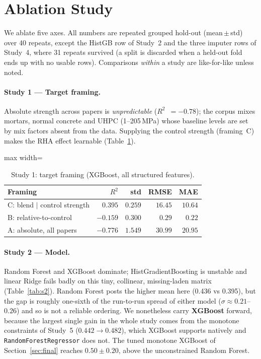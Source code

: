 \documentclass[11pt]{article}
\newcommand{\R}{$R^2$}
\begin{document}
\section{Ablation Study}
We ablate five axes. All numbers are repeated grouped hold-out (mean\,$\pm$\,std) over
40 repeats, except the HistGB row of Study~2 and the three imputer rows of Study~4,
where 31 repeats survived (a split is discarded when a held-out fold ends up with no
usable rows). Comparisons \emph{within} a study are like-for-like unless noted.

\paragraph{Study 1 --- Target framing.}
Absolute strength across papers is \emph{unpredictable} (\R{}~$=-0.78$); the corpus
mixes mortars, normal concrete and UHPC (1--205\,MPa) whose baseline levels are set by
mix factors absent from the data. Supplying the control strength (framing~C) makes the
RHA effect learnable (Table~\ref{tab:s1}).
\begin{table}[H]\centering\small
\caption{Study 1: target framing (XGBoost, all structured features).}
\label{tab:s1}
\begin{adjustbox}{max width=\linewidth}
\begin{tabular}{lrrrr}
\toprule
Framing & \R{} & std & RMSE & MAE \\
\midrule
\rowcolor{green!12}C: blend $\mid$ control strength & $0.395$ & $0.259$ & $16.45$ & $10.64$ \\
B: relative-to-control & $-0.159$ & $0.300$ & $0.29$ & $0.22$ \\
A: absolute, all papers & $-0.776$ & $1.549$ & $30.99$ & $20.95$ \\
\bottomrule
\end{tabular}
\end{adjustbox}
\end{table}


\paragraph{Study 2 --- Model.}
Random Forest and XGBoost dominate; HistGradientBoosting is unstable and linear
Ridge fails badly on this tiny, collinear, missing-laden matrix
(Table~\ref{tab:s2}). Random Forest posts the higher mean here (0.436 vs 0.395), but
the gap is roughly one-sixth of the run-to-run spread of either model
($\sigma\approx0.21$--$0.26$) and so is not a reliable ordering. We nonetheless carry
\textbf{XGBoost} forward, because the largest single gain in the whole study comes from
the monotone constraints of Study~5 ($0.442\rightarrow0.482$), which XGBoost supports
natively and \texttt{RandomForestRegressor} does not. The tuned monotone XGBoost of
Section~\ref{sec:final} reaches $0.50\pm0.20$, above the unconstrained Random Forest.
\end{document}
